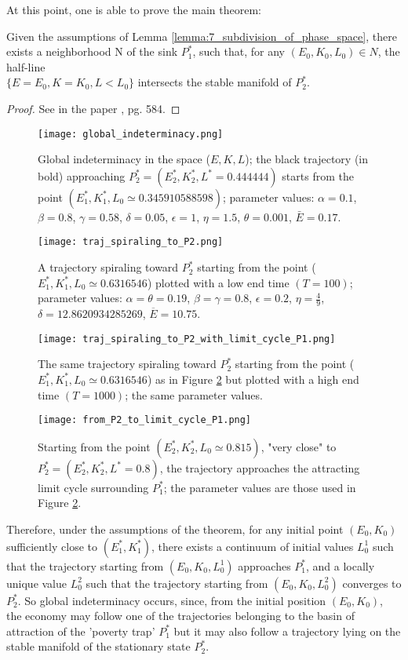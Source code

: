 At this point, one is able to prove the main theorem: 
\begin{thm}\label{thm:10_neighbor_of_P1_inters_manifold_P2}
	Given the assumptions of Lemma \ref{lemma:7_subdivision_of_phase_space}, there exists a neighborhood N of the sink $P_1^*$, such that, for any $(E_0,K_0,L_0)\in N$, the half-line \\$\{E=E_0,K = K_0,L < L_0\}$ intersects the stable manifold of $P_2^*$.
\end{thm}
\begin{proof}
	See in the paper \cite{antoci_poverty_2011}, pg. 584. 
\end{proof}
\begin{figure}[h!]
	\centering
	\texttt{[image: global\_indeterminacy.png]}
	\caption{Global indeterminacy in the space ($E,K,L$); the black trajectory (in bold) approaching $P_2^*=(E_2^*,K_2^*,L^*=0.444444)$ starts from the point $(E_1^*,K_1^*,L_0\simeq 0.345910588598)$; parameter values: $\alpha=0.1$, $\beta=0.8$, $\gamma=0.58$, $\delta=0.05$, $\epsilon=1$, $\eta=1.5$, $\theta=0.001$, $\bar{E}=0.17$.}
	\label{fig:global_indeter}
\end{figure}
\begin{figure}[h!]
	\centering
	\texttt{[image: traj\_spiraling\_to\_P2.png]}
	\caption{A trajectory spiraling toward $P_2^*$ starting from the point ($E_1^*,K_1^*,L_0 \simeq 0.6316546$) plotted with a low end time $(T=100)$; parameter values: $\alpha=\theta=0.19$, $\beta=\gamma=0.8$, $\epsilon=0.2$, $\eta=\frac{4}{9}$, $\delta=12.8620934285269$, $\overline{E}=10.75$.}
	\label{fig:traj_spiral_P2}
\end{figure}
\begin{figure}[h!]
	\centering
	\texttt{[image: traj\_spiraling\_to\_P2\_with\_limit\_cycle\_P1.png]}
	\caption{The same trajectory spiraling toward $P_2^*$ starting from the point ($E_1^*,K_1^*,L_0 \simeq 0.6316546$) as in Figure \ref{fig:traj_spiral_P2} but plotted with a high end time $(T=1000)$; the same parameter values.}
	\label{fig:traj_spiral_P2_with_limit_cycle_P1}
\end{figure}
\begin{figure}[h!]
	\centering
	\texttt{[image: from\_P2\_to\_limit\_cycle\_P1.png]}
	\caption{Starting from the point $(E_2^*,K_2^*,L_0 \simeq 0.815)$, "very close" to $P_2^*=(E_2^*,K_2^*,L^*=0.8)$, the trajectory approaches the attracting limit cycle surrounding $P_1^*$; the parameter values are those used in Figure \ref{fig:traj_spiral_P2}.}
	\label{fig:from_P2_to_limit_cycle_P1}
\end{figure}
Therefore, under the assumptions of the theorem, for any initial point $(E_0, K_0)$ sufficiently close to $(E_1^*, K_1^*)$, there exists a continuum of initial values $L_0^1$ such that the trajectory starting from $(E_0, K_0, L_0^1)$ approaches $P_1^*$, and a locally unique value $L_0^2$ such that the trajectory starting from $(E_0, K_0,L_0^2)$ converges to $P_2^*$. So global indeterminacy occurs, since, from the initial position $(E_0, K_0)$, the economy may follow one of the trajectories belonging to the basin of attraction of the 'poverty trap' $P_1^*$ but it may also follow a trajectory lying on the stable manifold of the stationary state $P_2^*$.

